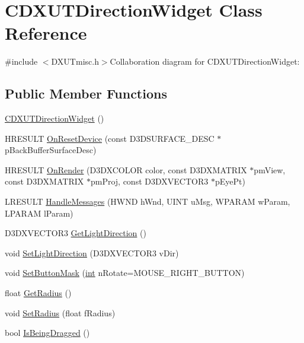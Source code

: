 \hypertarget{class_c_d_x_u_t_direction_widget}{
\section{CDXUTDirectionWidget Class Reference}
\label{class_c_d_x_u_t_direction_widget}
}


{\ttfamily \#include $<$DXUTmisc.h$>$}Collaboration diagram for CDXUTDirectionWidget:\subsection*{Public Member Functions}
\begin{DoxyCompactItemize}
\item 
\hyperlink{class_c_d_x_u_t_direction_widget_ab7899fd28008dba0d9e116c4c122e379}{CDXUTDirectionWidget} ()
\item 
HRESULT \hyperlink{class_c_d_x_u_t_direction_widget_ae0750529e0920a79eb814782bf91132e}{OnResetDevice} (const D3DSURFACE\_\-DESC $\ast$pBackBufferSurfaceDesc)
\item 
HRESULT \hyperlink{class_c_d_x_u_t_direction_widget_a794aeb666eb91f791434215cfe608edc}{OnRender} (D3DXCOLOR color, const D3DXMATRIX $\ast$pmView, const D3DXMATRIX $\ast$pmProj, const D3DXVECTOR3 $\ast$pEyePt)
\item 
LRESULT \hyperlink{class_c_d_x_u_t_direction_widget_aa31062654d6963e8c763626b2413e2c4}{HandleMessages} (HWND hWnd, UINT uMsg, WPARAM wParam, LPARAM lParam)
\item 
D3DXVECTOR3 \hyperlink{class_c_d_x_u_t_direction_widget_ad9b37b2fd57967a6284cb56abe1c5e3a}{GetLightDirection} ()
\item 
void \hyperlink{class_c_d_x_u_t_direction_widget_a05adf625e2a190ed1e238ddf1879e924}{SetLightDirection} (D3DXVECTOR3 vDir)
\item 
void \hyperlink{class_c_d_x_u_t_direction_widget_a00effccf13b6c745ab7e3d327a147074}{SetButtonMask} (\hyperlink{_d_x_u_tgui_8cpp_a2d77ed03302b6978834ee3b6f57837fb}{int} nRotate=MOUSE\_\-RIGHT\_\-BUTTON)
\item 
float \hyperlink{class_c_d_x_u_t_direction_widget_a6d6a395df8932ae372b2f7eea3b17f00}{GetRadius} ()
\item 
void \hyperlink{class_c_d_x_u_t_direction_widget_addcf13e0f53367fc773228c987bae9b9}{SetRadius} (float fRadius)
\item 
bool \hyperlink{class_c_d_x_u_t_direction_widget_a9705e4cdb115b728a6a87d3d535ec64c}{IsBeingDragged} ()
\end{DoxyCompactItemize}
